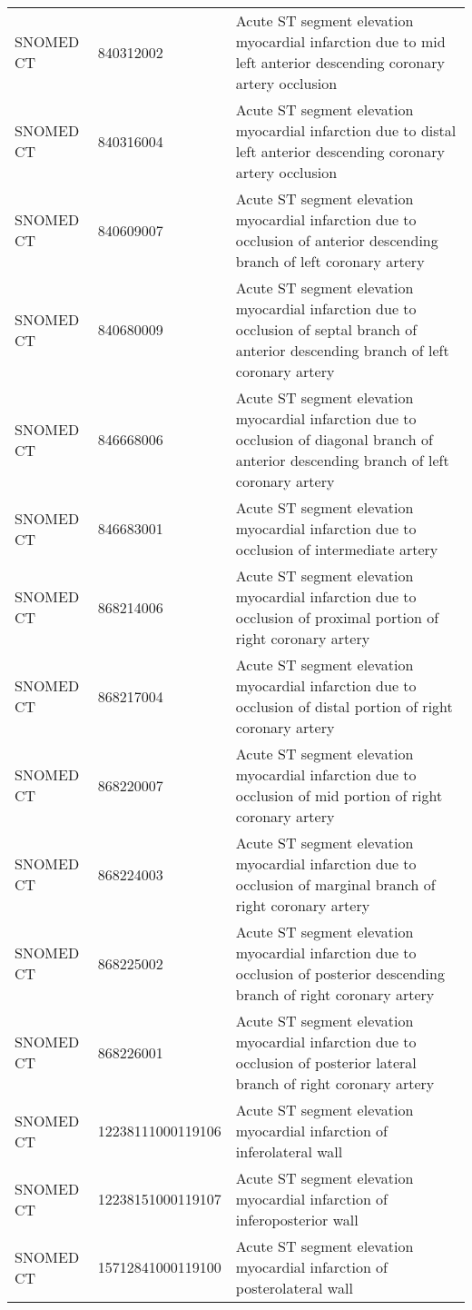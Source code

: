 \begin{longtable}{p{}p{}p{}}
  SNOMED CT & 840312002 & Acute ST segment elevation myocardial infarction due to mid left anterior descending coronary artery occlusion \\ 
  SNOMED CT & 840316004 & Acute ST segment elevation myocardial infarction due to distal left anterior descending coronary artery occlusion \\ 
  SNOMED CT & 840609007 & Acute ST segment elevation myocardial infarction due to occlusion of anterior descending branch of left coronary artery \\ 
  SNOMED CT & 840680009 & Acute ST segment elevation myocardial infarction due to occlusion of septal branch of anterior descending branch of left coronary artery \\ 
  SNOMED CT & 846668006 & Acute ST segment elevation myocardial infarction due to occlusion of diagonal branch of anterior descending branch of left coronary artery \\ 
  SNOMED CT & 846683001 & Acute ST segment elevation myocardial infarction due to occlusion of intermediate artery \\ 
  SNOMED CT & 868214006 & Acute ST segment elevation myocardial infarction due to occlusion of proximal portion of right coronary artery \\ 
  SNOMED CT & 868217004 & Acute ST segment elevation myocardial infarction due to occlusion of distal portion of right coronary artery \\ 
  SNOMED CT & 868220007 & Acute ST segment elevation myocardial infarction due to occlusion of mid portion of right coronary artery \\ 
  SNOMED CT & 868224003 & Acute ST segment elevation myocardial infarction due to occlusion of marginal branch of right coronary artery \\ 
  SNOMED CT & 868225002 & Acute ST segment elevation myocardial infarction due to occlusion of posterior descending branch of right coronary artery \\ 
  SNOMED CT & 868226001 & Acute ST segment elevation myocardial infarction due to occlusion of posterior lateral branch of right coronary artery \\ 
  SNOMED CT & 12238111000119106 & Acute ST segment elevation myocardial infarction of inferolateral wall \\ 
  SNOMED CT & 12238151000119107 & Acute ST segment elevation myocardial infarction of inferoposterior wall \\ 
  SNOMED CT & 15712841000119100 & Acute ST segment elevation myocardial infarction of posterolateral wall \\ 

\end{longtable}
